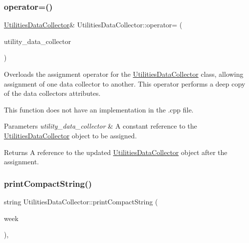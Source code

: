 \subsubsection{\texorpdfstring{operator=()}{operator=()}}
{\footnotesize\ttfamily \mbox{\hyperlink{classUtilitiesDataCollector}{Utilities\+Data\+Collector}}\& Utilities\+Data\+Collector\+::operator= (\begin{DoxyParamCaption}\item[{const \mbox{\hyperlink{classUtilitiesDataCollector}{Utilities\+Data\+Collector}} \&}]{utility\+\_\+data\+\_\+collector }\end{DoxyParamCaption})}



Overloads the assignment operator for the {\ttfamily \mbox{\hyperlink{classUtilitiesDataCollector}{Utilities\+Data\+Collector}}} class, allowing assignment of one data collector to another. This operator performs a deep copy of the data collector\textquotesingle{}s attributes. 

This function does not have an implementation in the .cpp file.


\begin{DoxyParams}{Parameters}
{\em utility\+\_\+data\+\_\+collector} & A constant reference to the {\ttfamily \mbox{\hyperlink{classUtilitiesDataCollector}{Utilities\+Data\+Collector}}} object to be assigned.\\
\hline
\end{DoxyParams}
\begin{DoxyReturn}{Returns}
A reference to the updated {\ttfamily \mbox{\hyperlink{classUtilitiesDataCollector}{Utilities\+Data\+Collector}}} object after the assignment. 
\end{DoxyReturn}
\mbox{\label{classUtilitiesDataCollector_a57b5f9cd8ddf54154476749ab0977355}} 
\subsubsection{\texorpdfstring{print\+Compact\+String()}{printCompactString()}}
{\footnotesize\ttfamily string Utilities\+Data\+Collector\+::print\+Compact\+String (\begin{DoxyParamCaption}\item[{int}]{week }\end{DoxyParamCaption})\hspace{0.3cm}{\ttfamily [override]}, {\ttfamily [virtual]}}



